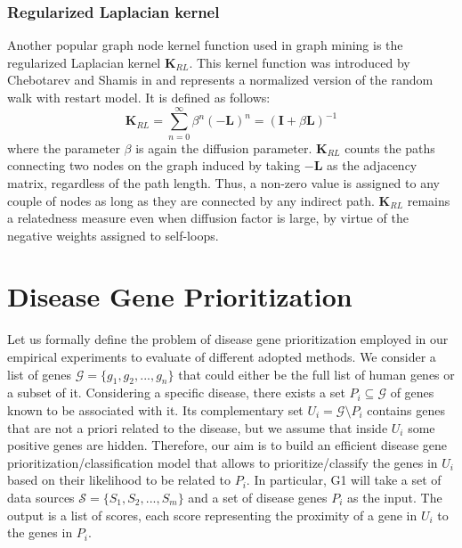 \subsubsection*{Regularized Laplacian kernel}
Another popular graph node kernel function used in graph mining is the regularized Laplacian kernel $\textbf{K}_{RL}$. This kernel function was introduced by Chebotarev and Shamis in \cite{rlk} and represents a normalized version of the random walk with restart model. It is defined as follows:
\begin{equation} \label{RLK-formula}
\textbf{K}_{RL} = \sum_{n=0}^{\infty}\beta^{n}(-\textbf{L})^n = (\textbf{I} + \beta \textbf{L})^{-1}
\end{equation}
where the parameter $\beta$ is again the diffusion parameter. $\textbf{K}_{RL}$ counts the paths connecting two nodes on the graph induced by taking $-\textbf{L}$ as the adjacency matrix, regardless of the path length. Thus, a non-zero value is assigned to any couple of nodes as long as they are connected by any indirect path. $\textbf{K}_{RL}$ remains a relatedness measure even when diffusion factor is large, by virtue of the negative weights assigned to self-loops.

\section{Disease Gene Prioritization}
Let us formally define the problem of disease gene prioritization employed in our empirical experiments to evaluate of different adopted methods. We consider a list of genes $\mathcal{G} = \lbrace g_{1}, g_{2},...,g_{n}\rbrace$ that could either be the full list of human genes or a subset of it. Considering a specific disease, there exists a set $P_{i}\subseteq \mathcal{G}$ of genes known to be associated with it. Its complementary set $U_{i}=\mathcal{G} \setminus P_{i}$ contains genes that are not a priori related to the disease, but we assume that inside $U_i$ some positive genes are hidden. Therefore, our aim is to build an efficient disease gene prioritization/classification model that allows to prioritize/classify the genes in $U_{i}$ based on their likelihood to be related to $P_{i}$. In particular, G1 will take a set of data sources $\mathcal{S}=\lbrace S_{1}, S_{2},...,S_{m} \rbrace$ and a set of disease genes $P_{i}$ as the input. The output is a list of scores, each score representing the proximity of a gene in $U_{i}$ to the genes in $P_i$.
